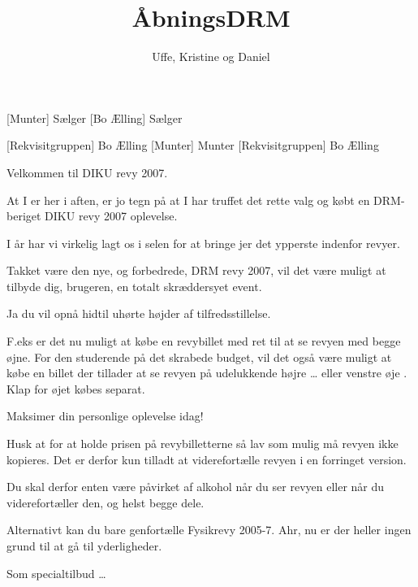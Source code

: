 \documentclass[a4paper,11pt]{article}
\title{ÅbningsDRM}
\author{Uffe, Kristine og Daniel}
\begin{document}
\maketitle

\begin{roles}
[Munter] Sælger
[Bo Ælling] Sælger
\end{roles}

\begin{props}
[Rekvisitgruppen] Bo Ælling
[Munter] Munter
[Rekvisitgruppen] Bo Ælling
\end{props}

  
\begin{sketch}
 Velkommen til DIKU revy 2007.

 At I er her i aften, er jo tegn på at I har truffet det rette
valg og købt en DRM-beriget DIKU revy 2007 oplevelse.

 I år har vi virkelig lagt os i selen for at bringe jer det
ypperste indenfor revyer.

 Takket være den nye, og forbedrede, DRM revy 2007, vil det
være muligt at tilbyde dig, brugeren, en totalt skræddersyet event.

 Ja du vil opnå hidtil uhørte højder af tilfredsstillelse.

 F.eks er det nu muligt at købe en revybillet med ret til at
se revyen med begge øjne. For den studerende på det skrabede budget,
vil det også være muligt at købe en billet der tillader at se revyen
på udelukkende højre  \ldots{} eller venstre øje . Klap for øjet købes separat.

 Maksimer din personlige oplevelse idag!

 Husk at for at holde prisen på revybilletterne så lav som
mulig må revyen ikke kopieres. Det er derfor kun tilladt at
viderefortælle revyen i en forringet version.

 Du skal derfor enten være påvirket af alkohol når du ser
revyen eller når du viderefortæller den, og helst begge dele.

 Alternativt kan du bare genfortælle Fysikrevy 2005-7.
 Ahr, nu er der heller ingen grund til at gå til yderligheder.

 Som specialtilbud \dots


\end{sketch}
\end{document}
